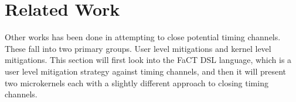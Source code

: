 \section{Related Work}\label{sec:related_work} %
Other works has been done in attempting to close potential timing channels.
These fall into two primary groups. User level mitigations and kernel level
mitigations. This section will first look into the FaCT DSL language, which is
a user level mitigation strategy against timing channels, and then it will
present two microkernels each with a slightly different approach to closing
timing channels.




